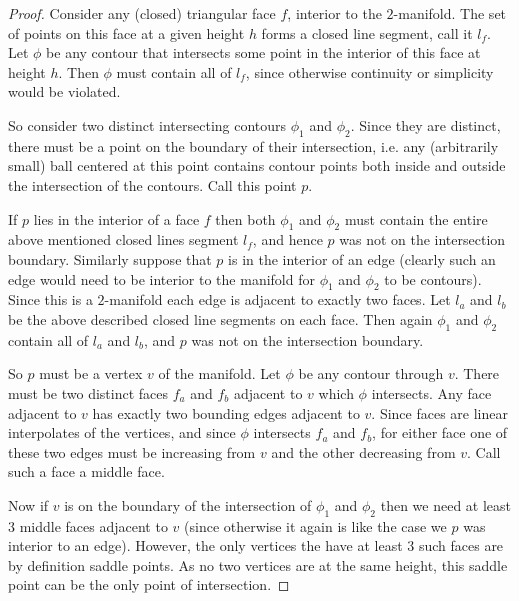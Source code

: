 \documentclass[11pt]{article}
\theoremstyle{definition}
\newcommand{\MM}{\mathbb{M}}
\begin{document}
\begin{proof}
Consider any (closed) triangular face $f$, interior to the $2$-manifold.  The set of points on this face at a given height $h$ forms a closed line segment, call it $l_f$.  Let $\phi$ be any contour that intersects some point in the interior of this face at height $h$.  Then $\phi$ must contain all of $l_f$, since otherwise continuity or simplicity would be violated.  

So consider two distinct intersecting contours $\phi_1$ and $\phi_2$.  Since they are distinct, there must be a point on the boundary of their intersection, i.e. any (arbitrarily small) ball centered at this point contains contour points both inside and outside the intersection of the contours.  Call this point $p$.

If $p$ lies in the interior of a face $f$ then both $\phi_1$ and $\phi_2$ must contain the entire above mentioned closed lines segment $l_f$, and hence $p$ was not on the intersection boundary. 
Similarly suppose that $p$ is in the interior of an edge (clearly such an edge would need to be interior to the manifold for $\phi_1$ and $\phi_2$ to be contours).  Since this is a $2$-manifold each edge is adjacent to exactly two faces.  Let $l_a$ and $l_b$ be the above described closed line segments on each face.  Then again $\phi_1$ and $\phi_2$ contain all of $l_a$ and $l_b$, and $p$ was not on the intersection boundary.

So $p$ must be a vertex $v$ of the manifold.  Let $\phi$ be any contour through $v$.  There must be two distinct faces $f_a$ and $f_b$ adjacent to $v$ which $\phi$ intersects.  Any face adjacent to $v$ has exactly two bounding edges adjacent to $v$.  Since faces are linear interpolates of the vertices, and since $\phi$ intersects $f_a$ and $f_b$, for either face one of these two edges must be increasing from $v$ and the other decreasing from $v$.  Call such a face a middle face.

Now if $v$ is on the boundary of the intersection of $\phi_1$ and $\phi_2$ then we need at least 3 middle faces adjacent to $v$ (since otherwise it again is like the case we $p$ was interior to an edge).  However, the only vertices the have at least 3 such faces are by definition saddle points.  As no two vertices are at the same height, this saddle point can be the only point of intersection.
\end{proof}

\end{document}
